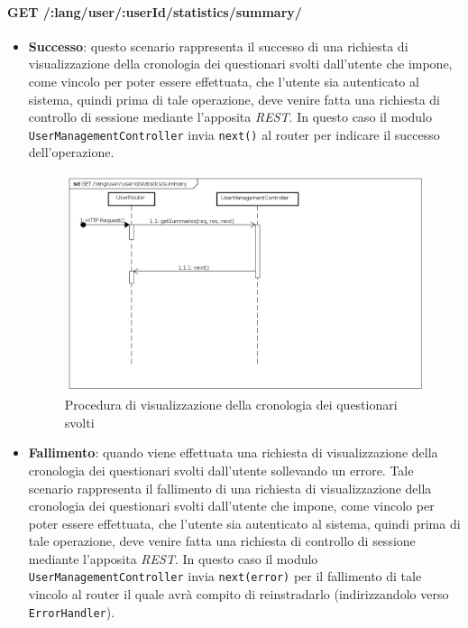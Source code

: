 \paragraph{GET /:lang/user/:userId/statistics/summary/}
\begin{itemize}
\item \textbf{Successo}: questo scenario rappresenta il successo di una richiesta di visualizzazione della cronologia dei questionari svolti dall'utente che impone, come vincolo per poter essere effettuata, che l'utente sia autenticato al sistema, quindi prima di tale operazione, deve venire fatta una richiesta di controllo di sessione mediante l'apposita \textit{REST}.  
In questo caso il modulo \texttt{UserManagementController} invia \texttt{next()} al router per indicare il successo dell'operazione.
\label{Procedura di visualizzazione della cronologia dei questionari svolti}
\begin{figure}[ht]
	\centering
	\includegraphics[scale=0.40]{UML/DiagrammiDiSequenza/Back-end/GET_LangUserUserIdStatisticsSummarySuccess.png}
	\caption{Procedura di visualizzazione della cronologia dei questionari svolti}
\end{figure}
\FloatBarrier
\item \textbf{Fallimento}: quando viene effettuata una richiesta di visualizzazione della cronologia dei questionari svolti dall'utente sollevando un errore. Tale scenario rappresenta il fallimento di una richiesta di visualizzazione della cronologia dei questionari svolti dall'utente che impone, come vincolo per poter essere effettuata, che l'utente sia autenticato al sistema, quindi prima di tale operazione, deve venire fatta una richiesta di controllo di sessione mediante l'apposita \textit{REST}. In questo caso il modulo \texttt{UserManagementController} invia \texttt{next(error)} per il fallimento di tale vincolo al router il quale avrà compito di reinstradarlo (indirizzandolo verso \texttt{ErrorHandler}).

\end{itemize}
